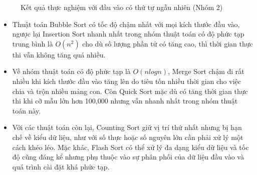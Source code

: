 \begin{figure}[H]
\caption{Kết quả thực nghiệm với đầu vào có thứ tự ngẫu nhiên (Nhóm 2)}
\end{figure}

\begin{itemize}[label=$\circ$]
    \item Thuật toán Bubble Sort có tốc độ chậm nhất với mọi kích thước 
    đầu vào, ngược lại Insertion Sort nhanh nhất trong nhóm thuật toán 
    có độ phức tạp trung bình là $O\left(n^2\right)$ cho dù số lượng phần tử có tăng 
    cao, thì thời gian thực thi vẫn không tăng quá nhiều. 
    \item Về nhóm thuật toán có độ phức tạp là $O\left(nlogn\right)$, 
    Merge Sort chậm đi rất nhiều khi kích thước đầu vào tăng lên do tiêu 
    tốn nhiều thời gian cho việc chia và trộn nhiều mảng con. Còn Quick 
    Sort mặc dù có tăng thời gian thực thi khi cỡ mẫu lớn hơn 100,000 
    nhưng vẫn nhanh nhất trong nhóm thuật toán này. 
    \item Với các thuật toán còn lại, Counting Sort giữ vị trí thứ nhất 
    nhưng bị hạn chế về kiểu dữ liệu, như với số thực hoặc số nguyên lớn 
    cần phải xử lý một cách khéo léo. Mặc khác, Flash Sort có thể xử lý 
    đa dạng kiểu dữ liệu và tốc độ cũng đáng kể nhưng phụ thuộc vào sự 
    phân phối của dữ liệu đầu vào và quá trình cài đặt khá phức tạp.
\end{itemize}

